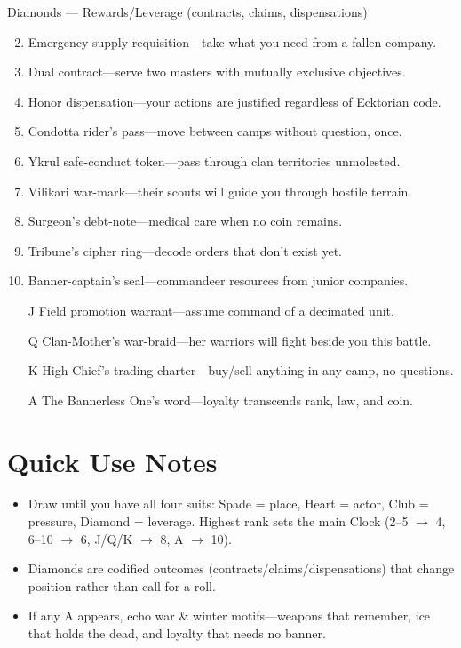 Diamonds --- Rewards/Leverage (contracts, claims, dispensations)
\begin{enumerate}
\setcounter{enumi}{1}
\item Emergency supply requisition---take what you need from a fallen company.
\item Dual contract---serve two masters with mutually exclusive objectives.
\item Honor dispensation---your actions are justified regardless of Ecktorian code.
\item Condotta rider's pass---move between camps without question, once.
\item Ykrul safe-conduct token---pass through clan territories unmolested.
\item Vilikari war-mark---their scouts will guide you through hostile terrain.
\item Surgeon's debt-note---medical care when no coin remains.
\item Tribune's cipher ring---decode orders that don't exist yet.
\item Banner-captain's seal---commandeer resources from junior companies.
\item[J] Field promotion warrant---assume command of a decimated unit.
\item[Q] Clan-Mother's war-braid---her warriors will fight beside you this battle.
\item[K] High Chief's trading charter---buy/sell anything in any camp, no questions.
\item[A] The Bannerless One's word---loyalty transcends rank, law, and coin.
\end{enumerate}

\section*{Quick Use Notes}
\begin{itemize}
\item Draw until you have all four suits: Spade = place, Heart = actor, Club = pressure, Diamond = leverage. Highest rank sets the main Clock (2--5 $\rightarrow$ 4, 6--10 $\rightarrow$ 6, J/Q/K $\rightarrow$ 8, A $\rightarrow$ 10).
\item Diamonds are codified outcomes (contracts/claims/dispensations) that change position rather than call for a roll.
\item If any A appears, echo war \& winter motifs---weapons that remember, ice that holds the dead, and loyalty that needs no banner.
\end{itemize}
